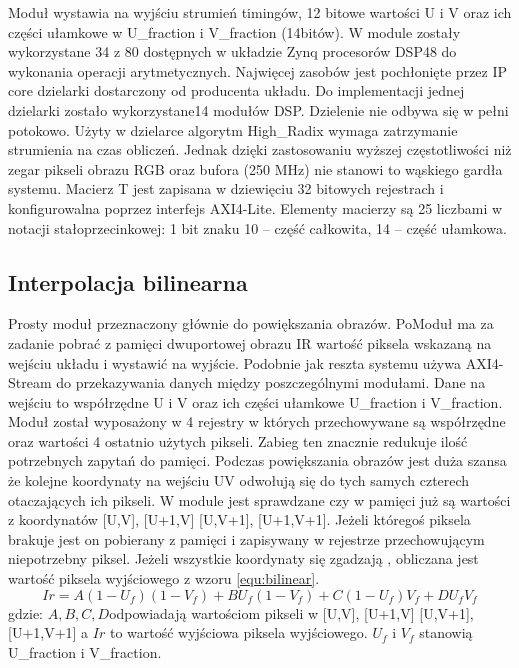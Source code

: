 Moduł wystawia na wyjściu strumień timingów, 12 bitowe wartości U i V oraz ich części ułamkowe w U\_fraction i V\_fraction (14bitów). W module zostały wykorzystane 34 z 80 dostępnych w układzie Zynq procesorów DSP48 do wykonania operacji arytmetycznych. Najwięcej zasobów jest pochłonięte przez IP core dzielarki dostarczony od producenta układu. Do implementacji jednej dzielarki zostało wykorzystane14 modułów DSP. Dzielenie nie odbywa się w pełni potokowo. Użyty w dzielarce algorytm High\_Radix wymaga zatrzymanie strumienia na czas obliczeń. Jednak dzięki zastosowaniu wyższej częstotliwości niż zegar pikseli obrazu RGB oraz bufora (250 MHz) nie stanowi to wąskiego gardła systemu. Macierz T jest zapisana  w dziewięciu 32 bitowych rejestrach i konfigurowalna poprzez interfejs AXI4-Lite. Elementy macierzy są 25 liczbami w notacji stałoprzecinkowej: 1 bit znaku 10 – część całkowita, 14 – część ułamkowa.



\subsection{Interpolacja bilinearna}
Prosty moduł przeznaczony głównie do powiększania obrazów. PoModuł ma za zadanie pobrać z pamięci dwuportowej obrazu IR wartość piksela wskazaną na wejściu układu i wystawić na wyjście. Podobnie jak reszta systemu używa AXI4-Stream do przekazywania danych między poszczególnymi modułami. Dane na wejściu to współrzędne U i V oraz ich części ułamkowe U\_fraction i V\_fraction. Moduł został wyposażony w 4 rejestry w których przechowywane są współrzędne oraz wartości 4 ostatnio użytych pikseli. Zabieg ten znacznie redukuje ilość potrzebnych zapytań do pamięci. Podczas powiększania obrazów jest duża szansa że kolejne koordynaty na wejściu UV odwołują się do tych samych czterech otaczających ich pikseli. W module jest sprawdzane czy w pamięci już są wartości z koordynatów [U,V], [U+1,V] [U,V+1], [U+1,V+1]. Jeżeli któregoś piksela brakuje jest on pobierany z pamięci i zapisywany w rejestrze przechowującym niepotrzebny piksel. Jeżeli wszystkie koordynaty się zgadzają , obliczana jest wartość piksela wyjściowego z wzoru \ref{equ:bilinear}.  
\begin{equation}\label{equ:bilinear}
Ir = A(1-U_f)(1-V_f)+BU_f(1-V_f)+C(1-U_f)V_f+ D U_fV_f
\end{equation}
\noindent gdzie: $ A, B, C ,D $odpowiadają wartościom pikseli w [U,V], [U+1,V] [U,V+1], [U+1,V+1] a $ Ir $ to wartość wyjściowa piksela wyjściowego. $U_f$ i $V_f$ stanowią U\_fraction i V\_fraction.


